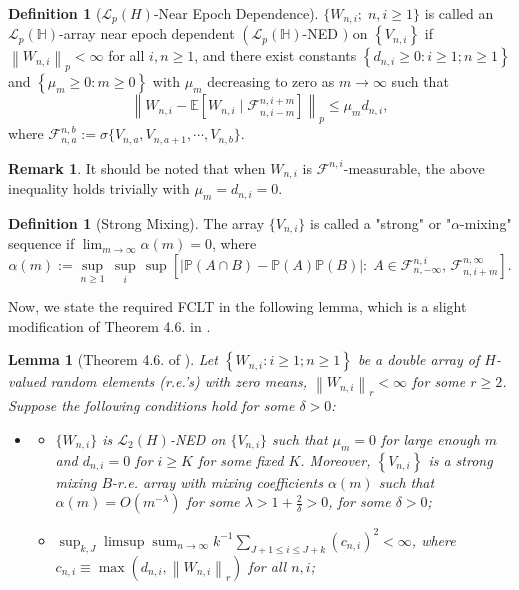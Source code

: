 \documentclass[11pt]{article}
\newcommand{\cL}{\mathcal{L}}
\newcommand{\bE}{\mathbb{E}}
\newcommand{\bP}{\mathbb{P}}
\theoremstyle{plain}
\newtheorem{lemma}[theorem]{Lemma}
\theoremstyle{definition}
\newtheorem{definition}[theorem]{Definition}
\newtheorem{remark}{Remark}
\theoremstyle{remark}
\begin{document}
\begin{appendix}
\begin{definition}[$\cL_p(H)$-Near Epoch Dependence]
    $\{W_{n,i};\;n,i\geq 1\}$ is called an $\cL_p(\mathbb{H})$-array near epoch dependent $\left(\cL_p(\mathbb{H})\right.$-NED $)$ on $\left\{V_{n, i}\right\}$ if $\left\|W_{n, i}\right\|_p<\infty$ for all $i, n \geq 1$, and there exist constants $\left\{d_{n, i} \geq 0: i \geq 1 ; n \geq 1\right\}$ and $\left\{\mu_m \geq 0: m \geq 0\right\}$ with $\mu_m$ decreasing to zero as $m \rightarrow \infty$ such that
$$
\left\|W_{n, i}-\bE\left[W_{n, i} \mid \mathcal{F}_{n, i-m}^{n, i+m}\right]\right\|_p \leq \mu_m d_{n, i},
$$
where $\mathcal{F}_{n,a}^{n,b}:=\sigma\{V_{n,a},V_{n,a+1},\cdots,V_{n,b}\}.$

\end{definition}
\begin{remark}
   It should be noted that when $W_{n,i}$ is $\mathcal{F}^{n,i}$-measurable, the above inequality holds trivially with $\mu_m=d_{n,i}=0$.
\end{remark}
\begin{definition}[Strong Mixing]
    The array $\{V_{n,i}\}$ is called a "strong" or "\(\alpha\)-mixing" sequence if $\lim_{m \to \infty}\alpha(m)=0$, where
    \[\alpha(m):=\sup_{n \geq 1}\,\sup_i\,\sup \left[|\bP(A \cap B)-\bP(A)\bP(B)|:\;A \in \mathcal{F}_{n,-\infty}^{n,i},\,\mathcal{F}_{n,i+m}^{n,\infty}\right].\]
\end{definition}
Now, we state the required FCLT in the following lemma, which is a slight modification of Theorem 4.6. in \cite{chen1998central}.
\begin{lemma}[Theorem 4.6. of \cite{chen1998central}]\label{lemma:fclt_chen_white}
   Let $\left\{W_{n, i}: i \geq 1 ; n \geq 1\right\}$ be a double array of $H$-valued random elements (r.e.'s) with zero means, $\left\|W_{n, i}\right\|_r<\infty$ for some $r \geq 2$.
   Suppose the following conditions hold for some $\delta>0$:
   \begin{itemize}
       \item [(a)]
       \begin{itemize}
           \item[(i)] $\{W_{n,i}\}$ is $\mathcal{L}_2(H)$-NED on $\{V_{n,i}\}$ such that $\mu_m=0$ for large enough $m$ and $d_{n,i}=0$ for $i\geq K$ for some fixed $K$. Moreover, $\left\{V_{n, i}\right\}$ is a strong mixing $B$-r.e. array with mixing coefficients $\alpha(m)$ such that $\alpha(m)=O(m^{-\lambda})$ for some $\lambda>1+\frac{2}{\delta}>0$, for some $\delta>0$;
           \item [(ii)] $\sup _{k, J} \limsup \operatorname{sum}_{n \rightarrow \infty} k^{-1} \sum_{J+1 \leq i \leq J+k}\left(c_{n, i}\right)^2<\infty$, where $c_{n, i} \equiv \max \left(d_{n, i},\left\|W_{n, i}\right\|_r\right)$ for all $n, i$;

\end{itemize}
\end{itemize}
\end{lemma}
\end{appendix}
\end{document}
